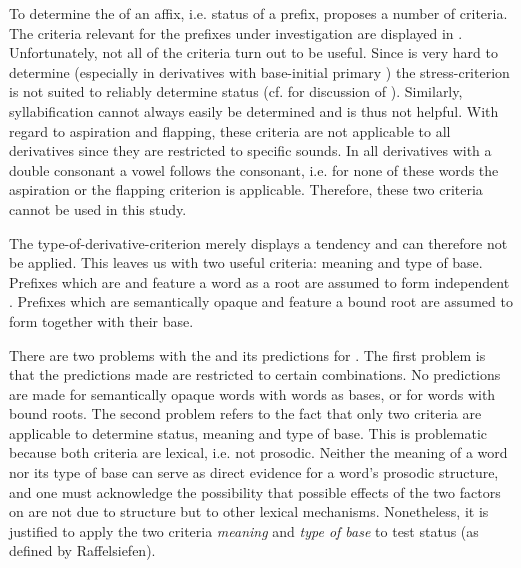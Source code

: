 To determine the  of an affix, i.e.  status of a prefix, \cite{Raffelsiefen.1999} proposes a number of criteria. The criteria relevant for the prefixes under investigation are displayed in . Unfortunately, not all of the criteria turn out to be useful. Since  is very hard to determine (especially in derivatives with base-initial primary ) the stress-criterion is not suited to reliably determine  status (cf.  for discussion of ). Similarly, syllabification cannot always easily be determined and is thus not helpful. 
With regard to aspiration and flapping, these criteria are not applicable to all derivatives since they are restricted to specific sounds. In all derivatives with a double consonant a vowel follows the consonant, i.e. for none of these words the aspiration or the flapping criterion is applicable. Therefore, these two criteria cannot be used in this study.

The type-of-derivative-criterion merely displays a tendency and can therefore not be applied. 
This leaves us with two useful criteria: meaning and type of base. Prefixes which are  and feature a word as a root are assumed to form independent . Prefixes which are semantically opaque and feature a bound root are assumed to form  together with their base. 

There are two problems with the  and its predictions for . 
The first problem is that the predictions made are restricted to certain combinations. No predictions are made for semantically opaque words with words as bases, or for  words with bound roots. 
The second problem refers to the fact that only two criteria are applicable to determine  status, meaning and type of base. This is problematic because both criteria are lexical, i.e. not prosodic. Neither the meaning of a word nor its type of base can serve as direct evidence for a word's prosodic structure, and one must acknowledge the possibility that possible effects of the two factors on  are not due to  structure but to other lexical mechanisms. 
Nonetheless, it is justified to apply the two criteria \textit{meaning} and \textit{type of base} to test  status (as defined by Raffelsiefen). 

